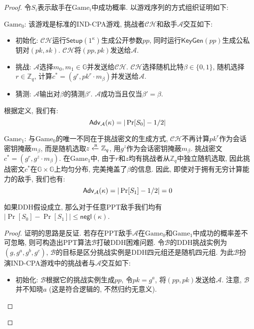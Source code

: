 \begin{proof}
令$S_i$表示敌手在$\text{Game}_i$中成功概率. 以游戏序列的方式组织证明如下: 

\begin{trivlist}
\item $\text{Game}_0$: 该游戏是标准的IND-CPA游戏, 挑战者$\mathcal{CH}$和敌手$\mathcal{A}$交互如下: 
\begin{itemize}
	\item 初始化: $\mathcal{CH}$运行$\mathsf{Setup}(1^\kappa)$生成公开参数$pp$, 
		同时运行$\mathsf{KeyGen}(pp)$生成公私钥对$(pk, sk)$. $\mathcal{CH}$将$(pp, pk)$发送给$\mathcal{A}$. 

	\item 挑战: $\mathcal{A}$选择$m_0, m_1 \in \mathbb{G}$并发送给$\mathcal{CH}$. 
		$\mathcal{CH}$选择随机比特$\beta \in \{0,1\}$, 随机选择$r \in \mathbb{Z}_q$, 
		计算$c^* = (g^r, pk^r \cdot m_\beta)$并发送给$\mathcal{A}$.  

	\item 猜测: $\mathcal{A}$输出对$\beta$的猜测$\beta'$. $\mathcal{A}$成功当且仅当$\beta' = \beta$. 
\end{itemize} 
根据定义, 我们有: 
\begin{equation*}
	\mathsf{Adv}_\mathcal{A}(\kappa) = |\Pr[S_0] - 1/2|
\end{equation*}

\item $\text{Game}_1$: 与$\text{Game}_0$的唯一不同在于挑战密文的生成方式, 
	$\mathcal{CH}$不再计算$pk^r$作为会话密钥掩蔽$m_\beta$, 而是随机选取$z \xleftarrow{\textup{\tiny R}} \mathbb{Z}_q$, 用$g^z$作为会话密钥掩蔽$m_\beta$. 
	挑战密文$c^* = (g^r, g^z \cdot m_\beta)$. 在$\text{Game}_1$中, 由于$r$和$z$均有挑战者从$\mathbb{Z}_q$中独立随机选取, 
	因此挑战密文$c^*$在$\mathbb{G} \times \mathbb{G}$上均匀分布, 完美掩盖了$\beta$的信息. 
	因此, 即使对于拥有无穷计算能力的敌手, 我们也有:   
\begin{equation*}
	\mathsf{Adv}_\mathcal{A}(\kappa) = |\Pr[S_1] - 1/2| = 0
\end{equation*}
\end{trivlist}

\begin{lemma}
如果DDH假设成立, 那么对于任意PPT敌手我们均有$|\Pr[S_0]-\Pr[S_1]| \leq \mathsf{negl}(\kappa)$. 
\end{lemma}

\begin{proof}
证明的思路是反证. 若存在PPT敌手$\mathcal{A}$在$\text{Game}_0$和$\text{Game}_1$中成功的概率差不可忽略, 
则可构造出PPT算法$\mathcal{B}$打破DDH困难问题. 
令$\mathcal{B}$的DDH挑战实例为$(g, g^a, g^b, g^c)$, $\mathcal{B}$的目标是区分挑战实例是DDH四元组还是随机四元组.  
为此$\mathcal{B}$扮演IND-CPA游戏中的挑战者与$\mathcal{A}$交互如下: 
\begin{itemize}
	\item 初始化: $\mathcal{B}$根据它的挑战实例生成$pp$, 令$pk = g^a$, 将$(pp, pk)$发送给$\mathcal{A}$. 
		注意, $\mathcal{B}$并不知晓$a$ (这是符合逻辑的, 不然归约无意义).  


\end{itemize}
\end{proof}
\end{proof}
